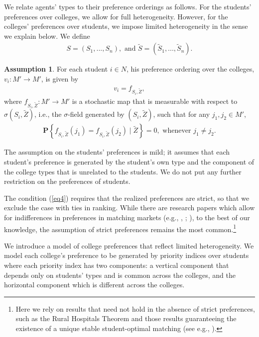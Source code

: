 \documentclass[12pt, fullpage]{amsart}
\theoremstyle{definition}
\theoremstyle{definition}
\newtheorem{assumption}{Assumption}[section]
\theoremstyle{definition}
\begin{document}
\begin{bibunit}[econometrica]
We relate agents' types to their preference orderings as follows. For the students' preferences over colleges, we allow for full heterogeneity. However, for the colleges' preferences over students, we impose limited heterogeneity in the sense we explain below. We define
\begin{align*}
	S = (S_1,...,S_n), \text{ and } \tilde{S}=(\tilde{S}_1,...,\tilde{S}_n).
\end{align*}
\begin{assumption}
	\label{assump: index utility1}
	For each student $i \in N$, his preference ordering over the colleges, $v_i : M' \rightarrow M'$, is given by 
	\begin{align}
		\label{vi}
		v_i = f_{S_i,\tilde Z},
	\end{align}
    where $f_{S_i,\tilde Z}: M' \rightarrow M'$ is a stochastic map that is measurable with respect to $\sigma(S_i,\tilde Z)$, i.e., the $\sigma$-field generated by $(S_i,\tilde Z)$, such that for any $j_1,j_2 \in M'$,
    \begin{align}
    	\label{eq4}
    	\mathbf{P}\left\{f_{S_i,\tilde Z}(j_1) = f_{S_i,\tilde Z}(j_2) \mid \tilde Z\right\} = 0, \text{ whenever } j_1 \ne j_2.
    \end{align}
\end{assumption}
The assumption on the students' preferences is mild; it assumes that each student's preference is generated by the student's own type and the component of the college types that is unrelated to the students. We do not put any further restriction on the preferences of students. 

The condition (\ref{eq4}) requires that the realized preferences are strict, so that we exclude the case with ties in ranking. While there are research papers which allow for indifferences in preferences in matching markets (e.g., \cite{Erdil/Ergin:2008:AER}, \cite{Erdil/Ergin:2017:JET}; \citet{Abdulkadiroglu/Agarwal/Pathak:2017:AER}), to the best of our knowledge, the assumption of strict preferences remains the most common.\footnote{Here we rely on results that need not hold in the absence of strict preferences, such as the Rural Hospitals Theorem and those results guaranteeing the existence of a unique stable student-optimal matching (see e.g., \cite{Roth/Sotomayor:90:TwoSidedMatching}).}

We introduce a model of college preferences that reflect limited heterogeneity. We model each college's preference to be generated by priority indices over students where each priority index has two components: a vertical component that depends only on students' types and is common across the colleges, and the horizontal component which is different across the colleges.


\end{bibunit}
\end{document}
